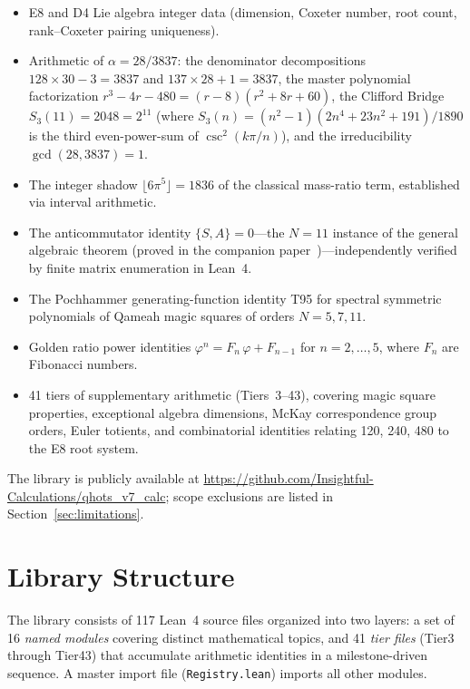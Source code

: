 \documentclass[11pt,a4paper]{article}
\begin{document}
\begin{itemize}
  \item E8 and D4 Lie algebra integer data (dimension, Coxeter number, root
        count, rank--Coxeter pairing uniqueness).
  \item Arithmetic of $\alpha = 28/3837$: the denominator decompositions
        $128\times 30-3=3837$ and $137\times 28+1=3837$, the master
        polynomial factorization $r^3-4r-480=(r-8)(r^2+8r+60)$, the
        Clifford Bridge $S_3(11)=2048=2^{11}$ (where
        $S_3(n)=(n^2{-}1)(2n^4{+}23n^2{+}191)/1890$ is the third
        even-power-sum of $\csc^2(k\pi/n)$), and the irreducibility
        $\gcd(28,3837)=1$.
  \item The integer shadow $\lfloor 6\pi^5\rfloor = 1836$ of the classical
        mass-ratio term, established via interval arithmetic.
  \item The anticommutator identity $\{S,A\}=0$---the $N{=}11$ instance
        of the general algebraic theorem (proved in the companion
        paper~\cite{qhots_v69})---independently verified by finite matrix
        enumeration in Lean~4.
  \item The Pochhammer generating-function identity T95 for spectral symmetric
        polynomials of Qameah magic squares of orders $N=5,7,11$.
  \item Golden ratio power identities $\varphi^n = F_n\,\varphi + F_{n-1}$
        for $n=2,\ldots,5$, where $F_n$ are Fibonacci numbers.
  \item 41 tiers of supplementary arithmetic (Tiers~3--43), covering magic
        square properties, exceptional algebra dimensions, McKay
        correspondence group orders, Euler totients, and combinatorial
        identities relating 120, 240, 480 to the E8 root system.
\end{itemize}

The library is publicly available at \url{https://github.com/Insightful-Calculations/qhots_v7_calc};
scope exclusions are listed in Section~\ref{sec:limitations}.

\section{Library Structure}
\label{sec:structure}

The library consists of 117 Lean~4 source files organized into two layers:
a set of 16 \emph{named modules} covering distinct mathematical topics,
and 41 \emph{tier files} (Tier3 through Tier43) that accumulate
arithmetic identities in a milestone-driven sequence.  A master import
file (\texttt{Registry.lean}) imports all other modules.
\end{document}
